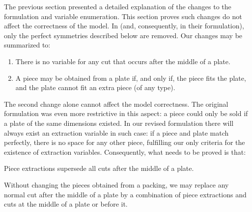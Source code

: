 \documentclass[ppgc,tese,english,formais,babel]{iiufrgs}
\begin{document}
The previous section presented a detailed explanation of the changes to the formulation and variable enumeration.
This section proves such changes do not affect the correctness of the model.
In \citet{furini:2016} (and, consequently, in their formulation), only the perfect symmetries described below are removed.
Our changes may be summarized to:

\begin{enumerate}
\item There is no variable for any cut that occurs after the middle of a plate.
\item A piece may be obtained from a plate if, and only if, the piece fits the plate, and the plate cannot fit an extra piece (of any type).
\end{enumerate}

The second change alone cannot affect the model correctness.
The original formulation was even more restrictive in this aspect:
a piece could only be sold if a plate of the same dimensions existed.
In our revised formulation there will always exist an extraction variable in such case:
if a piece and plate match perfectly, there is no space for any other piece, fulfilling our only criteria for the existence of extraction variables.
Consequently, what needs to be proved is that:

\begin{theorem}{Piece extractions supersede all cuts after the middle of a plate.}

Without changing the pieces obtained from a packing, we may replace any normal cut after the middle of a plate by a combination of piece extractions and cuts at the middle of a plate or before it.
\label{the:enhanced_correctness}
\end{theorem}

\end{document}
